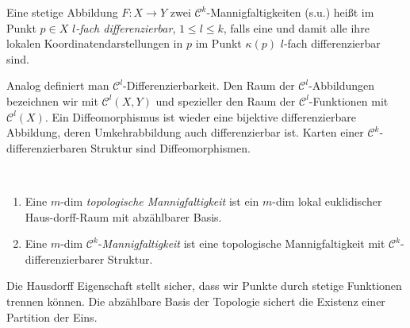 \begin{definition}
\begin{mdframed}
Eine stetige Abbildung $F:X \to Y$ zwei $\mathcal{C}^k$-Mannigfaltigkeiten (s.u.) heißt im Punkt $p\in X$ \emph{$l$-fach differenzierbar}, $1\leq l \leq k$, falls eine und damit alle ihre lokalen Koordinatendarstellungen in $p$ im Punkt $\kappa(p)$ $l$-fach differenzierbar sind.
\end{mdframed}
\end{definition}
Analog definiert man $\mathcal{C}^l$-Differenzierbarkeit. Den Raum der $\mathcal{C}^l$-Abbildungen bezeichnen wir mit $\mathcal{C}^l(X,Y)$ und spezieller den Raum der $\mathcal{C}^l$-Funktionen mit $\mathcal{C}^l(X)$. Ein Diffeomorphismus ist wieder eine bijektive differenzierbare Abbildung, deren Umkehrabbildung auch differenzierbar ist. Karten einer $\mathcal{C}^k$-differenzierbaren Struktur sind Diffeomorphismen.

\begin{definition}
\begin{mdframed}\
\begin{enumerate}[topsep=0.2pc]
	\item Eine $m$-dim \emph{topologische Mannigfaltigkeit} ist ein $m$-dim lokal euklidischer Haus-dorff-Raum mit abzählbarer Basis.
	\item Eine $m$-dim $\mathcal{C}^k$-\emph{Mannigfaltigkeit} ist eine topologische Mannigfaltigkeit mit $\mathcal{C}^k$-differenzierbarer Struktur.
\end{enumerate}
\end{mdframed}
\end{definition}
Die Hausdorff Eigenschaft stellt sicher, dass wir Punkte durch stetige Funktionen trennen können. Die abzählbare Basis der Topologie sichert die Existenz einer Partition der Eins.

